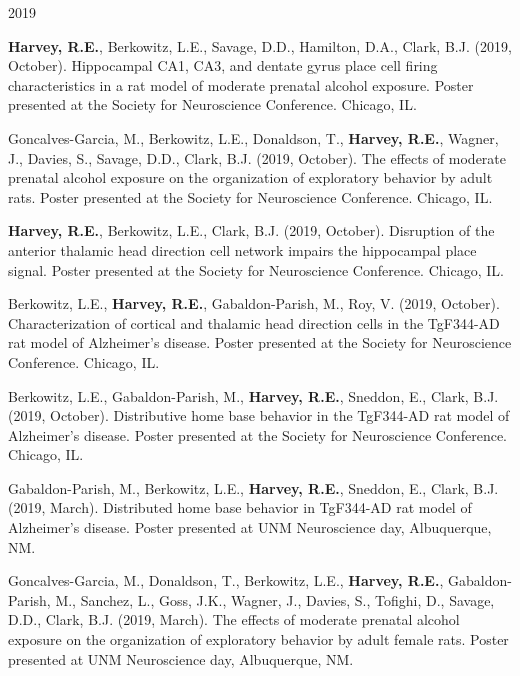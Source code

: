 \begin{cventries}
\cventry
    {} %
    {} %
    {} %
    {2019} %
    {
      \begin{cvitems} %
      \setlength\itemsep{0.35em}
        \item {\textbf{Harvey, R.E.}, Berkowitz, L.E., Savage, D.D., Hamilton, D.A., Clark, B.J. (2019, October). Hippocampal CA1, CA3, and dentate gyrus place cell firing characteristics in a rat model of moderate prenatal alcohol exposure. Poster presented at the Society for Neuroscience Conference. Chicago, IL.} 
        \item {Goncalves-Garcia, M., Berkowitz, L.E., Donaldson, T., \textbf{Harvey, R.E.}, Wagner, J., Davies, S., Savage, D.D., Clark, B.J. (2019, October). The effects of moderate prenatal alcohol exposure on the organization of exploratory behavior by adult rats. Poster presented at the Society for Neuroscience Conference. Chicago, IL.}
        \item {\textbf{Harvey, R.E.}, Berkowitz, L.E., Clark, B.J. (2019, October). Disruption of the anterior thalamic head direction cell network impairs the hippocampal place signal. Poster presented at the Society for Neuroscience Conference. Chicago, IL.}
        \item {Berkowitz, L.E., \textbf{Harvey, R.E.}, Gabaldon-Parish, M., Roy, V. (2019, October). Characterization of cortical and thalamic head direction cells in the TgF344-AD rat model of Alzheimer’s disease. Poster presented at the Society for Neuroscience Conference. Chicago, IL.}
        \item {Berkowitz, L.E., Gabaldon-Parish, M., \textbf{Harvey, R.E.}, Sneddon, E., Clark, B.J. (2019, October). Distributive home base behavior in the TgF344-AD rat model of Alzheimer’s disease. Poster presented at the Society for Neuroscience Conference. Chicago, IL.}
        \item {Gabaldon-Parish, M., Berkowitz, L.E., \textbf{Harvey, R.E.}, Sneddon, E., Clark, B.J. (2019, March). Distributed home base behavior in TgF344-AD rat model of Alzheimer’s disease. Poster presented at UNM Neuroscience day, Albuquerque, NM.}
        \item {Goncalves-Garcia, M., Donaldson, T., Berkowitz, L.E., \textbf{Harvey, R.E.}, Gabaldon-Parish, M., Sanchez, L., Goss, J.K., Wagner, J., Davies, S., Tofighi, D., Savage, D.D., Clark, B.J. (2019, March). The effects of moderate prenatal alcohol exposure on the organization of exploratory behavior by adult female rats. Poster presented at UNM Neuroscience day, Albuquerque, NM.}
      \end{cvitems}
    }
\end{cventries}

